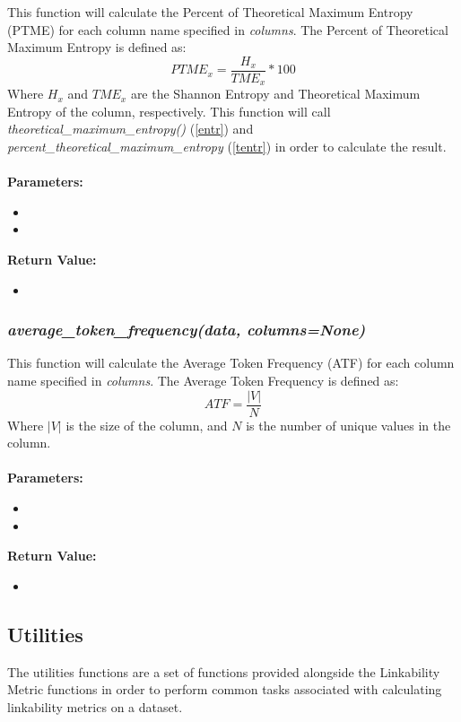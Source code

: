 \documentclass[titlepage, 11pt]{article}
\begin{document}
This function will calculate the Percent of Theoretical Maximum Entropy (PTME) for each column name specified in \textit{columns}. The Percent of Theoretical Maximum Entropy is defined as:
\begin{equation}
    PTME_x = \frac{H_x}{TME_x}*100
\end{equation}
Where $H_x$ and $TME_x$ are the Shannon Entropy and Theoretical Maximum Entropy of the column, respectively. This function will call \textit{theoretical\_maximum\_entropy()} (\ref{entr}) and\\ \textit{percent\_theoretical\_maximum\_entropy} (\ref{tentr}) in order to calculate the result.
\\
\\
\textbf{Parameters:}
\begin{itemize}
    \item \docdata
    \item \doccols
\end{itemize}
\textbf{Return Value:}
\begin{itemize}
    \item {}
\end{itemize}

\subsubsection{\textit{average\_token\_frequency(data, columns=None)}}

This function will calculate the Average Token Frequency (ATF) for each column name specified in \textit{columns}. The Average Token Frequency is defined as:
\begin{equation}
    ATF = \frac{|V|}{N}
\end{equation}
Where $|V|$ is the size of the column, and $N$ is the number of unique values in the column.
\\
\\
\textbf{Parameters:}
\begin{itemize}
    \item \docdata
    \item \doccols
\end{itemize}
\textbf{Return Value:}
\begin{itemize}
    \item {}
\end{itemize}

\subsection{Utilities}
The utilities functions are a set of functions provided alongside the Linkability Metric functions in order to perform common tasks associated with calculating linkability metrics on a dataset.
\end{document}
